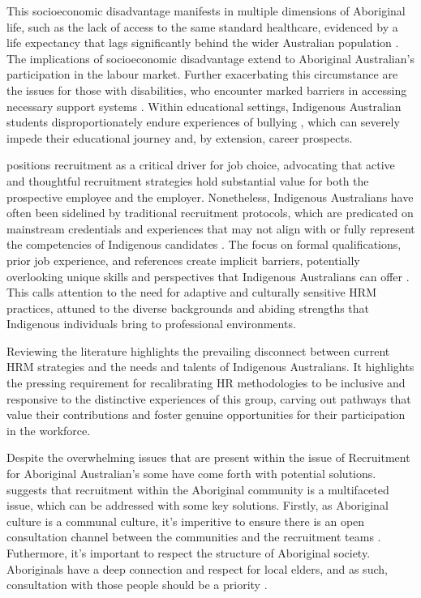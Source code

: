 \documentclass{article}
\begin{document}
This socioeconomic disadvantage manifests in multiple dimensions of Aboriginal life, such as the lack of access to the same standard healthcare, evidenced by a life expectancy that lags significantly behind the wider Australian population \parencite{leederAchievingEquityAustralian2003}. The implications of socioeconomic disadvantage extend to Aboriginal Australian's participation in the labour market. Further exacerbating this circumstance are the issues for those with disabilities, who encounter marked barriers in accessing necessary support systems \parencite{statisticsChapterDisability2011}. Within educational settings, Indigenous Australian students disproportionately endure experiences of bullying \parencite{coffinBullyingAboriginalContext2010}, which can severely impede their educational journey and, by extension, career prospects. 

\cite{rynesImportanceRecruitmentJob1991} positions recruitment as a critical driver for job choice, advocating that active and thoughtful recruitment strategies hold substantial value for both the prospective employee and the employer. Nonetheless, Indigenous Australians have often been sidelined by traditional recruitment protocols, which are predicated on mainstream credentials and experiences that may not align with or fully represent the competencies of Indigenous candidates \cite{pearsonExtendingBoundariesHuman2011}. The focus on formal qualifications, prior job experience, and references create implicit barriers, potentially overlooking unique skills and perspectives that Indigenous Australians can offer \parencite{pearsonExtendingBoundariesHuman2011}. This calls attention to the need for adaptive and culturally sensitive HRM practices, attuned to the diverse backgrounds and abiding strengths that Indigenous individuals bring to professional environments.

Reviewing the literature highlights the prevailing disconnect between current HRM strategies and the needs and talents of Indigenous Australians. It highlights the pressing requirement for recalibrating HR methodologies to be inclusive and responsive to the distinctive experiences of this group, carving out pathways that value their contributions and foster genuine opportunities for their participation in the workforce.

Despite the overwhelming issues that are present within the issue of Recruitment for Aboriginal Australian's some have come forth with potential solutions. \cite{raeDevelopingResearchPartnership2013} suggests that recruitment within the Aboriginal community is a multifaceted issue, which can be addressed with some key solutions. Firstly, as Aboriginal culture is a communal culture, it's imperitive to ensure there is an open consultation channel between the communities and the recruitment teams \parencite{raeDevelopingResearchPartnership2013}. Futhermore, it's important to respect the structure of Aboriginal society. Aboriginals have a deep connection and respect for local elders, and as such, consultation with those people should be a priority \parencite{raeDevelopingResearchPartnership2013}.
\end{document}
